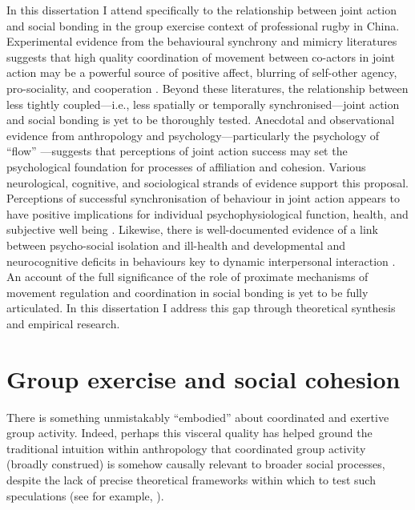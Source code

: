 In this dissertation I attend specifically to the relationship between joint action and social bonding in the group exercise context of professional rugby in China.  Experimental evidence from the behavioural synchrony and mimicry literatures suggests that high quality coordination of movement between co-actors in joint action may be a powerful source of positive affect, blurring of self-other agency, pro-sociality, and cooperation \citep{Mogan2017}.  Beyond these literatures, the relationship between less tightly coupled---i.e., less spatially or temporally synchronised---joint action and social bonding is yet to be thoroughly tested. Anecdotal and observational evidence from anthropology and psychology---particularly the psychology of ``flow'' \citep{Csikszentmihalyi1992,Jackson1999}---suggests that perceptions of joint action success may set the psychological foundation for processes of affiliation and cohesion.  Various neurological, cognitive, and sociological strands of evidence support this proposal.  Perceptions of successful synchronisation of behaviour in joint action appears to have positive implications for individual psychophysiological function, health, and subjective well being \citep{Wheatley2012}.  Likewise, there is well-documented evidence of a link between psycho-social isolation and ill-health and developmental and neurocognitive deficits in behaviours key to dynamic interpersonal interaction \citep[e.g.][]{Blakemore2005,Baron-Cohen1991}. An account of the full significance of the role of proximate mechanisms of movement regulation and coordination in social bonding is yet to be fully articulated. In this dissertation I address this gap through theoretical synthesis and empirical research.

\section{Group exercise and social cohesion}
There is something unmistakably ``embodied'' about coordinated and exertive group activity.
Indeed, perhaps this visceral quality has helped ground the traditional intuition within anthropology that coordinated group activity (broadly construed) is somehow causally relevant to broader social processes, despite the lack of precise theoretical frameworks within which to test such speculations (see for example, \citep{Durkheim1965,Mauss1935,Radcliffe-Brown1952,Turner1974,Merleau-Ponty1956,Bourdieu1990}).

